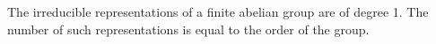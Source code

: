 The irreducible representations of a finite abelian group are of degree 1.
The number of such representations is equal to the order of the group.
